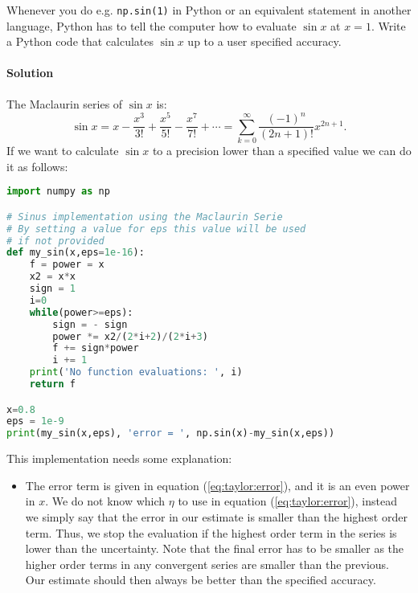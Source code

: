 \documentclass[graybox,sectrefs,envcountresetchap,open=right,final]{svmonodo}
\newenvironment{graybox2admon}[1][]{
\begin{graybox2mdframed}[frametitle=#1]
}
{
\end{graybox2mdframed}
}
\begin{document}
\begin{graybox2admon}[Example: evaluate $\sin x$]
Whenever you do e.g. \texttt{np.sin(1)} in Python or an equivalent statement in another language, Python has to tell the computer how to evaluate $\sin x$ at $x=1$. Write a Python code that calculates $\sin x$ up to a user specified accuracy.

\paragraph{Solution}
The Maclaurin series of $\sin x$ is:
\begin{equation}
\sin x = x-\frac{x^3}{3!}+\frac{x^5}{5!}-\frac{x^7}{7!}+\cdots=\sum_{k=0}^{\infty}\frac{(-1)^n}{(2n+1)!}x^{2n+1}.
\label{sin}
\end{equation}
If we want to calculate $\sin x$ to a precision lower than a specified value we can do it as follows:























\begin{lstlisting}[language=python,style=blue1bar]
import numpy as np

# Sinus implementation using the Maclaurin Serie
# By setting a value for eps this value will be used
# if not provided
def my_sin(x,eps=1e-16):
    f = power = x
    x2 = x*x
    sign = 1
    i=0
    while(power>=eps):
        sign = - sign
        power *= x2/(2*i+2)/(2*i+3)
        f += sign*power
        i += 1
    print('No function evaluations: ', i)
    return f

x=0.8
eps = 1e-9
print(my_sin(x,eps), 'error = ', np.sin(x)-my_sin(x,eps))

\end{lstlisting}


This implementation needs some explanation:

\begin{itemize}
\item The error term is given in equation (\ref{eq:taylor:error}), and it is an even power in $x$. We do not know which $\eta$ to use in equation (\ref{eq:taylor:error}), instead we simply say that the error in our estimate is smaller than the highest order term. Thus, we stop the evaluation if the highest order term in the series is lower than the uncertainty. Note that the final error has to be smaller as the higher order terms in any convergent series are smaller than the previous.  Our estimate should then always be better than the specified accuracy.


\end{itemize}
\end{graybox2admon}
\end{document}

